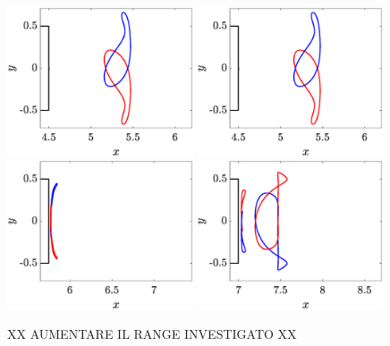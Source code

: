 \begin{figure}
  \centering
  \includegraphics[width=0.49\textwidth]{./fig/LagTrac/orb_AR4p5_Re410.eps}   
  \includegraphics[width=0.49\textwidth]{./fig/LagTrac/orb_AR4p5_Re410.eps} 
  \includegraphics[width=0.49\textwidth]{./fig/LagTrac/orb_AR5p75_Re550.eps}
  \includegraphics[width=0.49\textwidth]{./fig/LagTrac/orb_AR7_Re500.eps}
  \caption{XX AUMENTARE IL RANGE INVESTIGATO XX}
  \label{fig:part_res}
\end{figure}

